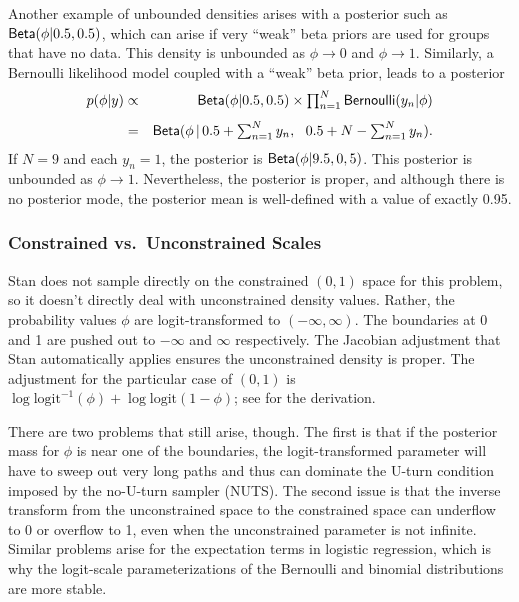 Another example of unbounded densities arises with a posterior such as
$\mbox{\sf Beta}(\phi|0.5,0.5)$, which can arise if very ``weak'' beta
priors are used for groups that have no data. This density is
unbounded as $\phi \rightarrow 0$ and $\phi \rightarrow 1$. Similarly,
a Bernoulli likelihood model coupled with a ``weak'' beta prior, leads
to a posterior
%
\begin{eqnarray*}
p(\phi|y) 
& \propto & \textstyle
\mbox{\sf Beta}(\phi|0.5,0.5) \times \prod_{n=1}^N \mbox{\sf Bernoulli}(y_n|\phi)
\\[4pt]
& = &\textstyle
\mbox{\sf Beta}(\phi \, | \, 0.5 + \sum_{n=1}^N y_n, \ \ 0.5 + N - \sum_{n=1}^N y_n).
\end{eqnarray*}
%
If $N = 9$ and each $y_n = 1$, the posterior is
$\mbox{\sf Beta}(\phi|9.5,0,5)$.  This posterior is unbounded as $\phi
\rightarrow 1$.  Nevertheless, the posterior is proper, and although
there is no posterior mode, the posterior mean is well-defined with a
value of exactly 0.95.

\subsubsection{Constrained vs.\ Unconstrained Scales}

Stan does not sample directly on the constrained $(0,1)$ space for
this problem, so it doesn't directly deal with unconstrained density
values.  Rather, the probability values $\phi$ are logit-transformed
to $(-\infty,\infty)$.  The boundaries at 0 and 1 are pushed out to
$-\infty$ and $\infty$ respectively.  The Jacobian adjustment that
Stan automatically applies ensures the unconstrained density is
proper.  The adjustment for the particular case of $(0,1)$ is $\log
\mbox{logit}^{-1}(\phi) + \log \mbox{logit}(1 - \phi)$; see
 for the derivation.

There are two problems that still arise, though.  The first is that if
the posterior mass for $\phi$ is near one of the boundaries, the
logit-transformed parameter will have to sweep out very long paths and
thus can dominate the U-turn condition imposed by the no-U-turn
sampler (NUTS).  The second issue is that the inverse transform from
the unconstrained space to the constrained space can underflow to 0 or
overflow to 1, even when the unconstrained parameter is not infinite.
Similar problems arise for the expectation terms in logistic
regression, which is why the logit-scale parameterizations of the
Bernoulli and binomial distributions are more stable.



